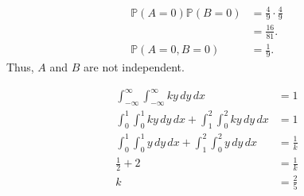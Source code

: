 \documentclass[12pt]{article}
\begin{document}
\medskip
{}
\begin{align*}
    \mathbb P(A = 0) \mathbb P(B = 0) &= \frac49 \cdot \frac49 \\
                                      &= \frac{16}{81}. \\
    \mathbb P(A = 0, B = 0) &= \frac19.
\end{align*} Thus, $A$ and $B$ are not independent.

\newpage
{}

\medskip
{}
\begin{align*}
    \int_{-\infty}^\infty \int_{-\infty}^\infty ky\,dy\,dx &= 1 \\
    \int_0^1\int_0^1ky\,dy\,dx + \int_1^2\int_0^2 ky\,dy\,dx &= 1 \\
    \int_0^1\int_0^1y\,dy\,dx + \int_1^2\int_0^2 y\,dy\,dx &= \frac1k \\
    \frac12 + 2 &= \frac1k \\
    k &= \frac25
\end{align*}

\end{document}
